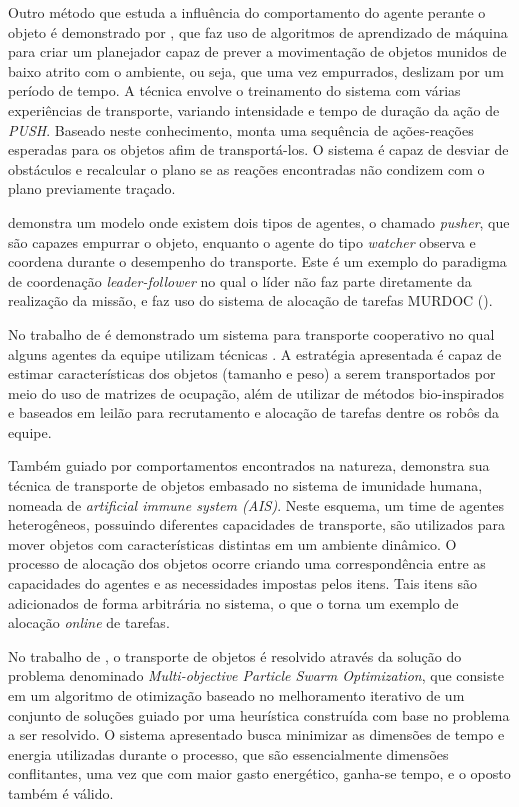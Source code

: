 Outro método que estuda a influência do comportamento do agente perante o objeto é demonstrado por \cite{Mericli2013}, que faz uso de algoritmos de aprendizado de máquina para criar um planejador capaz de prever a movimentação de objetos munidos de baixo atrito com o ambiente, ou seja, que uma vez empurrados, deslizam por um período de tempo.
A técnica envolve o treinamento do sistema com várias experiências de transporte, variando intensidade e tempo de duração da ação de \emph{PUSH}.
Baseado neste conhecimento, monta uma sequência de ações-reações esperadas para os objetos afim de transportá-los.
O sistema é capaz de desviar de obstáculos e recalcular o plano se as reações encontradas não condizem com o plano previamente traçado.

\cite{Gerkey2002} demonstra um modelo onde existem dois tipos de agentes, o chamado \emph{pusher}, que são capazes empurrar o objeto, enquanto o agente do tipo \emph{watcher} observa e coordena durante o desempenho do transporte. Este é um exemplo do paradigma de coordenação \emph{leader-follower} no qual o líder não faz parte diretamente da realização da missão, e faz uso do sistema de alocação de tarefas MURDOC (\cite{Gerkey2001}).

No trabalho de \cite{Costa2012} é demonstrado um sistema para transporte cooperativo no qual alguns agentes da equipe utilizam técnicas . A estratégia apresentada é capaz de estimar características dos objetos (tamanho e peso) a serem transportados por meio do uso de matrizes de ocupação, além de utilizar de métodos bio-inspirados e baseados em leilão para recrutamento e alocação de tarefas dentre os robôs da equipe.

Também guiado por comportamentos encontrados na natureza, \cite{Maghsoud2014} demonstra sua técnica de transporte de objetos embasado no sistema de imunidade humana, nomeada de \emph{artificial immune system (AIS)}. Neste esquema, um time de agentes heterogêneos, possuindo diferentes capacidades de transporte, são utilizados para mover objetos com características distintas em um ambiente dinâmico. O processo de alocação dos objetos ocorre criando uma correspondência entre as capacidades do agentes e as necessidades impostas pelos itens. Tais itens são adicionados de forma arbitrária no sistema, o que o torna um exemplo de alocação \emph{online} de tarefas.

No trabalho de \cite{Ghosh2012}, o transporte de objetos é resolvido através da solução do problema denominado \emph{Multi-objective Particle Swarm Optimization}, que consiste em um algoritmo de otimização baseado no melhoramento iterativo de um conjunto de soluções guiado por uma heurística construída com base no problema a ser resolvido. O sistema apresentado busca minimizar as dimensões de tempo e energia utilizadas durante o processo, que são essencialmente dimensões conflitantes, uma vez que com maior gasto energético, ganha-se tempo, e o oposto também é válido.

